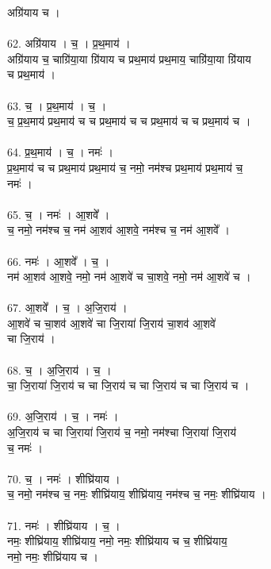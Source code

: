अग्रि॑याय च ।\\
\\
62. अग्रि॑याय । च॒ । प्र॒थ॒माय॑ ।\\
अग्रि॑याय च॒ चाग्रि॑या॒या ग्रि॑याय च प्रथ॒माय॑ प्रथ॒माय॒ चाग्रि॑या॒या ग्रि॑याय\\
च प्रथ॒माय॑ ।\\
\\
63. च॒ । प्र॒थ॒माय॑ । च॒ ।\\
च॒ प्र॒थ॒माय॑ प्रथ॒माय॑ च च प्रथ॒माय॑ च च प्रथ॒माय॑ च च प्रथ॒माय॑ च ।\\
\\
64. प्र॒थ॒माय॑ । च॒ । नमः॑ ।\\
प्र॒थ॒माय॑ च च प्रथ॒माय॑ प्रथ॒माय॑ च॒ नमो॒ नम॑श्च प्रथ॒माय॑ प्रथ॒माय॑ च॒\\
नमः॑ ।\\
\\
65. च॒ । नमः॑ । आ॒शवे᳚ ।\\
च॒ नमो॒ नम॑श्च च॒ नम॑ आ॒शव॑ आ॒शवे॒ नम॑श्च च॒ नम॑ आ॒शवे᳚ ।\\
\\
66. नमः॑ । आ॒शवे᳚ । च॒ ।\\
नम॑ आ॒शव॑ आ॒शवे॒ नमो॒ नम॑ आ॒शवे॑ च चा॒शवे॒ नमो॒ नम॑ आ॒शवे॑ च ।\\
\\
67. आ॒शवे᳚ । च॒ । अ॒जि॒राय॑ ।\\
आ॒शवे॑ च चा॒शव॑ आ॒शवे॑ चा जि॒राया॑ जि॒राय॑ चा॒शव॑ आ॒शवे॑\\
चा जि॒राय॑ ।\\
\\
68. च॒ । अ॒जि॒राय॑ । च॒ ।\\
चा॒ जि॒राया॑ जि॒राय॑ च चा जि॒राय॑ च चा जि॒राय॑ च चा जि॒राय॑ च ।\\
\\
69. अ॒जि॒राय॑ । च॒ । नमः॑ ।\\
अ॒जि॒राय॑ च चा जि॒राया॑ जि॒राय॑ च॒ नमो॒ नम॑श्चा जि॒राया॑ जि॒राय॑\\
च॒ नमः॑ ।\\
\\
70. च॒ । नमः॑ । शीघ्रि॑याय ।\\
च॒ नमो॒ नम॑श्च च॒ नमः॒ शीघ्रि॑याय॒ शीघ्रि॑याय॒ नम॑श्च च॒ नमः॒ शीघ्रि॑याय ।\\
\\
71. नमः॑ । शीघ्रि॑याय । च॒ ।\\
नमः॒ शीघ्रि॑याय॒ शीघ्रि॑याय॒ नमो॒ नमः॒ शीघ्रि॑याय च च॒ शीघ्रि॑याय॒\\
नमो॒ नमः॒ शीघ्रि॑याय च ।\\
\\
